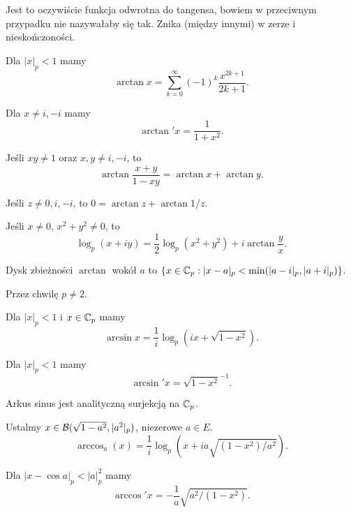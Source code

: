 Jest to oczywiście funkcja odwrotna do tangensa, bowiem w przeciwnym przypadku nie nazywałaby się tak.
Znika (między innymi) w zerze i nieskończoności.

\begin{fakt}
	Dla $|x|_p < 1$ mamy
	\[
		\arctan x = \sum_{k=0}^\infty (-1)^k \frac{x^{2k+1}}{2k+1}.
	\]
\end{fakt}

\begin{fakt}
	Dla $x \neq i, -i$ mamy
	\[
		\arctan' x = \frac 1{1 + x^2}.
	\]
\end{fakt}

\begin{fakt}
	Jeśli $xy \neq 1$ oraz $x,y \neq i, -i$, to
	\[
		\arctan \frac{x + y}{1 - xy} = \arctan x + \arctan y.
	\]
\end{fakt}

\begin{fakt}
	Jeśli $z \neq 0, i, -i$, to $0 = \arctan z + \arctan 1/z$.
\end{fakt}

\begin{fakt}
	Jeśli $x \neq 0$, $x^2  + y^2 \neq 0$, to
	\[
		\log_p (x +  iy) = \frac 12 \log_p (x^2 + y^2) + i \arctan \frac y x.
	\]
\end{fakt}

\begin{fakt}
	Dysk zbieżności $\arctan$ wokół $a$ to $\{x \in \mathbb C_p : |x - a|_p < \min (|a - i|_p, |a+i|_p)\}$.
\end{fakt}

Przez chwilę $p \neq 2$.

\begin{definicja}
	Dla  $|x|_p < 1$ i $x \in \mathbb C_p$ mamy 
	\[
		\arcsin x = \frac 1i \log_p (ix + \sqrt{1 - x^2}).
	\]
\end{definicja}

\begin{fakt}
	Dla $|x|_p < 1$ mamy
	\[
		\arcsin' x = \sqrt{1 - x^2}^{-1}.
	\]
\end{fakt}

\begin{fakt}
	Arkus sinus jest analityczną surjekcją na $\mathbb C_p$.
\end{fakt}

\begin{definicja}
	Ustalmy $x \in \mathcal B(\sqrt{1 - a^2}, |a^2|_p)$, niezerowe $a \in E$.
	\[
		\arccos_a(x) = \frac 1i \log_p (x + ia \sqrt{(1-x^2) / a^2}).
	\]
\end{definicja}

\begin{fakt}
	Dla $|x - \cos a|_p < |a|_p^2$ mamy
	\[
		\arccos' x = - \frac 1 a \sqrt{a^2 / (1-x^2)}.
	\]
\end{fakt}